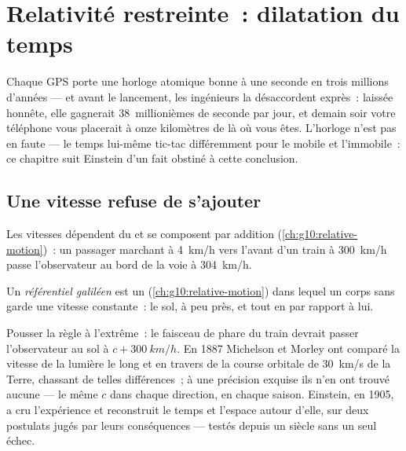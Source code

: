 \chapter{Relativité restreinte~: dilatation du temps}\label{ch:g12:special-relativity}

Chaque  GPS porte une horloge atomique bonne à une
seconde en trois millions d'années --- et avant le lancement, les
ingénieurs la désaccordent exprès~: laissée honnête, elle gagnerait
$38$~millionièmes de seconde par jour, et demain soir votre téléphone
vous placerait à onze kilomètres de là où vous êtes. L'horloge n'est
pas en faute --- le temps lui-même tic-tac différemment pour le mobile
et l'immobile~: ce chapitre suit Einstein d'un fait obstiné à cette
conclusion.

\section{Une vitesse refuse de s'ajouter}

Les vitesses dépendent du  et se composent par addition
(\cref{ch:g10:relative-motion})~: un passager marchant à \qty{4}{km/h}
vers l'avant d'un train à \qty{300}{km/h} passe l'observateur au bord
de la voie à \qty{304}{km/h}.

\begin{definition}\label{def:g12:special-relativity:inertial}
Un \emph{référentiel galiléen} est un
 (\cref{ch:g10:relative-motion}) dans lequel un
corps sans  garde une vitesse constante~: le sol, à peu près, et
tout  en  par rapport à lui.
\end{definition}

Pousser la règle à l'extrême~: le faisceau de phare du train devrait
passer l'observateur au sol à $c + \qty{300}{km/h}$. En 1887 Michelson
et Morley ont comparé la vitesse de la lumière le long et en travers
de la course orbitale de \qty{30}{km/s} de la Terre, chassant de telles
différences~; à une précision exquise ils n'en ont trouvé aucune ---
le même $c$ dans chaque direction, en chaque saison. Einstein, en
1905, a cru l'expérience et reconstruit le temps et l'espace autour
d'elle, sur deux postulats jugés par leurs conséquences --- testés
depuis un siècle sans un seul échec.

